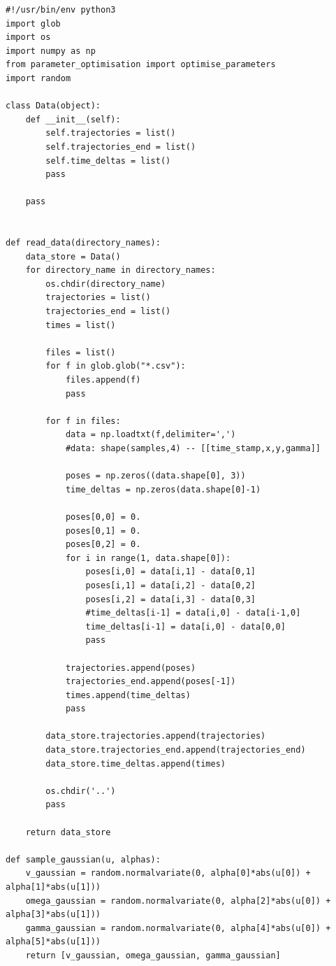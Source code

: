 \documentclass[a4paper, 12pt]{article}
\begin{document}
\begin{lstlisting}
#!/usr/bin/env python3
import glob
import os
import numpy as np
from parameter_optimisation import optimise_parameters
import random

class Data(object):
    def __init__(self):
        self.trajectories = list()
        self.trajectories_end = list()
        self.time_deltas = list()
        pass

    pass


def read_data(directory_names):
    data_store = Data()
    for directory_name in directory_names:
        os.chdir(directory_name)
        trajectories = list()
        trajectories_end = list()
        times = list()
        
        files = list()
        for f in glob.glob("*.csv"):
            files.append(f)
            pass
    
        for f in files:
            data = np.loadtxt(f,delimiter=',')
            #data: shape(samples,4) -- [[time_stamp,x,y,gamma]]           
            
            poses = np.zeros((data.shape[0], 3))
            time_deltas = np.zeros(data.shape[0]-1)
            
            poses[0,0] = 0.
            poses[0,1] = 0.
            poses[0,2] = 0.
            for i in range(1, data.shape[0]):
                poses[i,0] = data[i,1] - data[0,1]
                poses[i,1] = data[i,2] - data[0,2]
                poses[i,2] = data[i,3] - data[0,3]
                #time_deltas[i-1] = data[i,0] - data[i-1,0]
                time_deltas[i-1] = data[i,0] - data[0,0]
                pass
    
            trajectories.append(poses)
            trajectories_end.append(poses[-1])
            times.append(time_deltas)
            pass
    
        data_store.trajectories.append(trajectories)
        data_store.trajectories_end.append(trajectories_end)
        data_store.time_deltas.append(times)

        os.chdir('..')
        pass

    return data_store

def sample_gaussian(u, alphas):
    v_gaussian = random.normalvariate(0, alpha[0]*abs(u[0]) + alpha[1]*abs(u[1]))
    omega_gaussian = random.normalvariate(0, alpha[2]*abs(u[0]) + alpha[3]*abs(u[1]))
    gamma_gaussian = random.normalvariate(0, alpha[4]*abs(u[0]) + alpha[5]*abs(u[1]))
    return [v_gaussian, omega_gaussian, gamma_gaussian]


\end{lstlisting}
\end{document}
